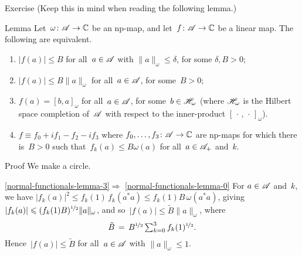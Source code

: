 \documentclass[a]{subfiles}
\begin{document}
\begin{parsec}
\begin{point}{Exercise}
(Keep this in mind when reading the following lemma.)
\end{point}
\begin{point}{Lemma}%
Let~$\omega\colon \scrA\to\C$ be an np-map,
and let~$f\colon \scrA\to \C$ be a linear map.
The following are equivalent.
\begin{enumerate}
\item\label{normal-functionals-lemma-0}
$\left|f(a)\right|\leq B$ for all~$a\in \scrA$
with $\|a\|_\omega\leq \delta$, for some $\delta,B>0$;
\item\label{normal-functionals-lemma-1}
$\left|f(a)\right| \leq B \|a\|_\omega$ for all~$a\in\scrA$,
for some~$B>0$;
\item\label{normal-functionals-lemma-2}
$f(a)=[b,a]_\omega$ for all~$a\in\scrA$, 
for some~$b\in\scrH_\omega$
(where $\scrH_\omega$ is the Hilbert space completion of~$\scrA$
with respect to the inner-product
$[\,\cdot\,,\,\cdot\,]_\omega$).
\item\label{normal-functionals-lemma-3}
$f\equiv f_0+if_1-f_2-if_3$
where $f_0,\dotsc,f_3\colon \scrA\to \C$
are np-maps for which there is~$B>0$
such that~$f_k(a)\leq B \omega(a)$ for all~$a\in\pos{\scrA}$ 
and~$k$. 
\end{enumerate}
\begin{point}{Proof}%
We make a circle.
\begin{point}{%
\ref{normal-functionals-lemma-3}$\Longrightarrow$%
\ref{normal-functionals-lemma-0}}%
For $a\in \scrA$ and~$k$, we have
$\left|f_k(a)\right|^2 \leq
f_k(1)\,f_k(a^*a) \leq f_k(1)B \,\omega(a^*a)$,
giving~$\left|f_k(a)\right| \leq (f_k(1)B)^{\nicefrac{1}{2}} \|a\|_\omega$,
and so~$\left|f(a)\right|\leq \tilde{B} \|a\|_\omega$,
where 
\begin{equation*}
	\textstyle
	\tilde{B} \,=\, B^{\nicefrac{1}{2}}\sum_{k=0}^3f_k(1)^{\nicefrac{1}{2}}.
\end{equation*}
Hence~$\left|f(a)\right|\leq \tilde{B}$
for all~$a\in\scrA$ with $\|a\|_\omega\leq 1$.
\end{point}
\end{point}
\end{point}
\end{parsec}
\end{document}
